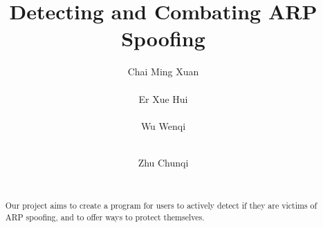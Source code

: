 \documentclass{acm_proc_article-sp}
\begin{document}
\title{Detecting and Combating ARP Spoofing}
%
%
%
%
%

%
\author{
%
%
\alignauthor
Chai Ming Xuan\\
       \\
\alignauthor
Er Xue Hui\\
       \\
\alignauthor 
Wu Wenqi\\
       \\
\and  %
\alignauthor Zhu Chunqi\\
       \\
}
\maketitle
\begin{abstract}
Our project aims to create a program for users to actively detect if they are victims of ARP spoofing, and to offer ways to protect themselves.
\end{abstract}
\end{document}
